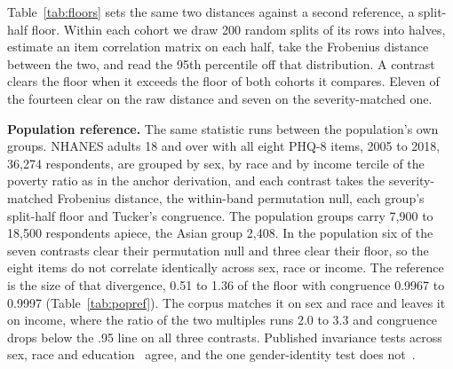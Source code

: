 \documentclass[wcp]{jmlr}
\let\cite\citep
\begin{document}
Table~\ref{tab:floors} sets the same two distances against a second reference, a split-half floor. Within each cohort we draw 200 random splits of its rows into halves, estimate an item correlation matrix on each half, take the Frobenius distance between the two, and read the 95th percentile off that distribution. A contrast clears the floor when it exceeds the floor of both cohorts it compares. Eleven of the fourteen clear on the raw distance and seven on the severity-matched one.

\textbf{Population reference.} The same statistic runs between the population's own groups. NHANES adults 18 and over with all eight PHQ-8 items, 2005 to 2018, 36,274 respondents, are grouped by sex, by race and by income tercile of the poverty ratio as in the anchor derivation, and each contrast takes the severity-matched Frobenius distance, the within-band permutation null, each group's split-half floor and Tucker's congruence. The population groups carry 7,900 to 18,500 respondents apiece, the Asian group 2,408. In the population six of the seven contrasts clear their permutation null and three clear their floor, so the eight items do not correlate identically across sex, race or income. The reference is the size of that divergence, 0.51 to 1.36 of the floor with congruence 0.9967 to 0.9997 (Table~\ref{tab:popref}). The corpus matches it on sex and race and leaves it on income, where the ratio of the two multiples runs 2.0 to 3.3 and congruence drops below the .95 line on all three contrasts. Published invariance tests across sex, race and education~\cite{patel2019phq9,cintron2023intersectional} agree, and the one gender-identity test does not~\cite{borgogna2020sexuality}.
\end{document}
